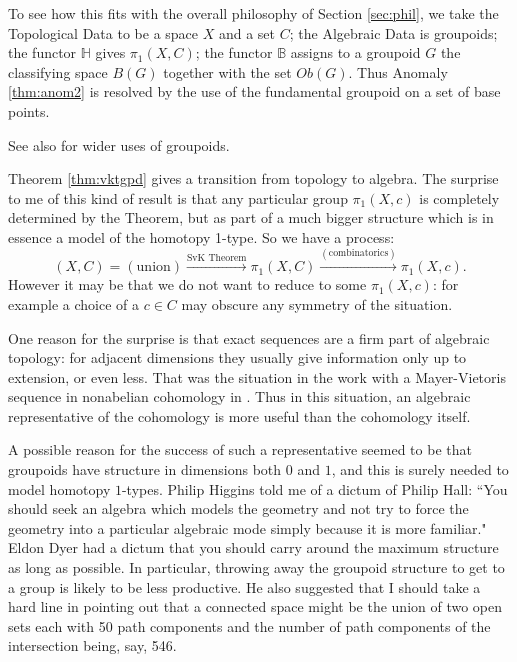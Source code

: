 \documentclass{elsarticle}
\def\B{\beta}
\def\B{\beta}
\def\B{\mathbb B}
\begin{document}
To see how this fits with the overall philosophy of Section \ref{sec:phil}, we take the Topological Data
to be a space $X$  and a set $C$; the Algebraic Data is groupoids; the functor $\mathbb H$  gives $\pi_1(X, C)$;
the functor $\B $ assigns to a groupoid $G$  the classifying space $B(G)$  together with the set $Ob(G)$.
Thus Anomaly \ref{thm:anom2} is resolved by the use of the fundamental groupoid on a set of base points.

See also \cite{B87} for wider uses of groupoids.

Theorem \ref{thm:vktgpd} gives a  transition from topology to algebra. The surprise to me of this kind
of result is that any particular group $\pi_1(X,c)$  is completely determined by the Theorem, but as
part of a much bigger structure which is in essence a model of the homotopy 1-type. So we have a process:
\begin{equation}
(X,C) = (\text{union}) \xrightarrow{\text{SvK Theorem}} \pi_1(X,C) \xrightarrow{(\text{combinatorics})} \pi_1(X,c) .
\end{equation}
However it may be that we do not want to reduce to some $\pi_1(X,c)$: for example a choice of a
$c \in C$  may obscure any symmetry of the situation.

One reason for the surprise is that exact sequences are a firm part of algebraic topology:
for adjacent dimensions they usually give information only up to extension, or even less.
That was the situation in the work with a Mayer-Vietoris sequence in nonabelian cohomology in \cite{B65}. Thus in this situation, an algebraic representative of the cohomology is more useful than the cohomology itself.

A possible reason for the success of such a representative seemed to be that groupoids have structure in dimensions
both $0$ and $1$, and this is surely needed to model homotopy $1$-types.  Philip Higgins told me of a dictum of
Philip Hall: ``You should seek an algebra which models the geometry and not try to force the geometry into a particular algebraic mode simply because it is more familiar."
Eldon Dyer had a dictum
that you should carry around the maximum structure as long as possible.  In particular,
throwing away the groupoid structure to get to a group is likely to be less productive. He also
suggested that I should take a hard line in pointing out that a connected space might be the
union of two open sets each with 50 path components and the number of path components of
the intersection being, say, 546.
\end{document}
